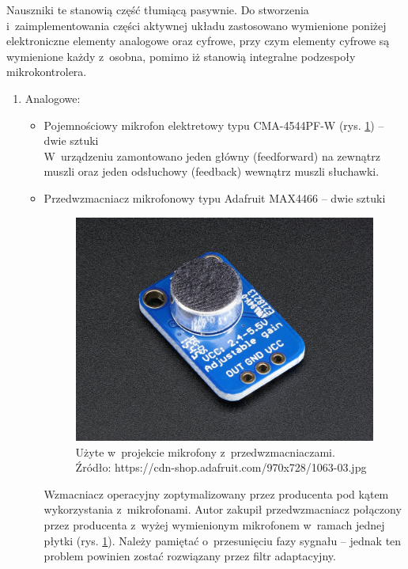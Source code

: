 Nauszniki te stanowią część tłumiącą pasywnie. Do stworzenia i~zaimplementowania części aktywnej układu zastosowano wymienione poniżej elektroniczne elementy analogowe oraz cyfrowe, przy czym elementy cyfrowe są wymienione każdy z~osobna, pomimo iż stanowią integralne podzespoły mikrokontrolera.
\begin{enumerate}
	\item Analogowe:
	\begin{itemize}
		\item Pojemnościowy mikrofon elektretowy typu CMA-4544PF-W (rys. \ref{fig:mikrofony_max4466}) -- dwie sztuki\\
		W~urządzeniu zamontowano jeden główny (feedforward) na zewnątrz muszli oraz jeden odsłuchowy (feedback) wewnątrz muszli słuchawki.
		\item Przedwzmacniacz mikrofonowy typu Adafruit MAX4466 -- dwie sztuki\\
		\begin{figure}[h!]
			\centering
			\includegraphics[scale=0.2]{../Assets/adafruit_max4466.png}
			\caption{Użyte w~projekcie mikrofony z~przedwzmacniaczami.\\ Źródło: https://cdn-shop.adafruit.com/970x728/1063-03.jpg}
			\label{fig:mikrofony_max4466}
		\end{figure}
		Wzmacniacz operacyjny zoptymalizowany przez producenta pod kątem wykorzystania z~mikrofonami. Autor zakupił przedwzmacniacz połączony przez producenta z~wyżej wymienionym mikrofonem w~ramach jednej płytki (rys. \ref{fig:mikrofony_max4466}). Należy pamiętać o~przesunięciu fazy sygnału -- jednak ten problem powinien zostać rozwiązany przez filtr adaptacyjny.

\end{itemize}
\end{enumerate}
